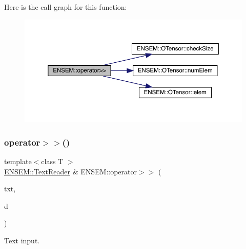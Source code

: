 Here is the call graph for this function\+:\nopagebreak
\begin{figure}[H]
\begin{center}
\leavevmode
\includegraphics[width=350pt]{de/d87/group__obstensor_ga6a7ad5b01079729a5dee60bd7e98e6e1_cgraph}
\end{center}
\end{figure}
\mbox{\label{group__obstensor_ga605e67dfa1237293bf39540ec4000032}} 
\subsubsection{\texorpdfstring{operator$>$$>$()}{operator>>()}\hspace{0.1cm}{\footnotesize\ttfamily [2/2]}}
{\footnotesize\ttfamily template$<$class T $>$ \\
\mbox{\hyperlink{classENSEM_1_1TextReader}{E\+N\+S\+E\+M\+::\+Text\+Reader}} \& E\+N\+S\+E\+M\+::operator$>$$>$ (\begin{DoxyParamCaption}\item[{\mbox{\hyperlink{classENSEM_1_1TextReader}{E\+N\+S\+E\+M\+::\+Text\+Reader}} \&}]{txt,  }\item[{\mbox{\hyperlink{classENSEM_1_1OTensor}{O\+Tensor}}$<$ T $>$ \&}]{d }\end{DoxyParamCaption})\hspace{0.3cm}{\ttfamily [inline]}}



Text input. 

